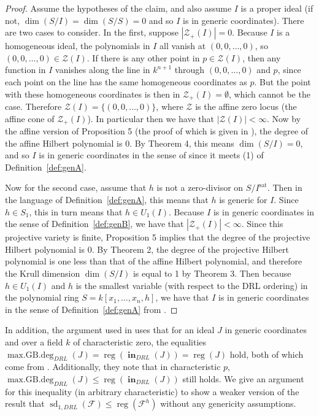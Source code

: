 \documentclass[11pt]{article}
\newcommand{\F}{\mathcal{F}}
\newcommand{\sat}{^{\text{sat}}}
\DeclareMathOperator{\Init}{\mathbf{in}}
\DeclareMathOperator{\sd}{sd}
\DeclareMathOperator{\reg}{reg}
\DeclareMathOperator{\mdeg}{max.GB.deg}
\theoremstyle{definition}
\begin{document}
\begin{proof}
	Assume the hypotheses of the claim, and also assume $I$ is a proper ideal (if not, $\dim(S/I) = \dim(S/S) = 0$ and so $I$ is in generic coordinates). There are two cases to consider. In the first, suppose $|\mathcal{Z}_+(I)| = 0$. Because $I$ is a homogeneous ideal, the polynomials in $I$ all vanish at $(0,0, \dots, 0)$, so $(0,0,\dots,0) \in \mathcal{Z}(I)$. If there is any other point in $p \in \mathcal{Z}(I)$, then any function in $I$ vanishes along the line in $k^{n+1}$ through $(0,0,\dots,0)$ and $p$, since each point on the line has the same homogeneous coordinates as $p$. But the point with these homogeneous coordinates is then in $\mathcal{Z}_+(I) = \emptyset$, which cannot be the case. Therefore $\mathcal{Z}(I) = \{(0,0,\dots,0)\}$, where $\mathcal{Z}$ is the affine zero locus (the affine cone of $\mathcal{Z}_+(I)$). In particular then we have that $|\mathcal{Z}(I)| < \infty$. Now by the affine version of Proposition 5 (the proof of which is given in \cite{cox2013ideals}), the degree of the affine Hilbert polynomial is 0. By Theorem 4, this means $\dim(S/I) = 0$, and so $I$ is in generic coordinates in the sense of \cite{bayer1987criterion} since it meets (1) of Definition~\ref{def:genA}. 

	Now for the second case, assume that $h$ is not a zero-divisor on $S/I\sat$. Then in the language of Definition~\ref{def:genA}, this means that $h$ is generic for $I$. Since $h \in S_1$, this in turn means that $h \in U_1(I)$. Because $I$ is in generic coordinates in the sense of Definition~\ref{def:genB}, we have that $|\mathcal{Z}_+(I)| < \infty$. Since this projective variety is finite, Proposition 5 implies that the degree of the projective Hilbert polynomial is 0. By Theorem 2, the degree of the projective Hilbert polynomial is one less than that of the affine Hilbert polynomial, and therefore the Krull dimension $\dim(S/I)$ is equal to 1 by Theorem 3. Then because $h \in U_1(I)$ and $h$ is the smallest variable (with respect to the DRL ordering) in the polynomial ring $S = k[x_1, \dots, x_n, h]$, we have that $I$ is in generic coordinates in the sense of Definition~\ref{def:genA} from \cite{bayer1987criterion}. 
\end{proof}


In addition, the argument used in \cite{caminata2020solving} uses that for an ideal $J$ in generic coordinates and over a field $k$ of characteristic zero, the equalities $\mdeg_{DRL}(J) = \reg(\Init_{DRL}(J)) = \reg(J)$ hold, both of which come from \cite{bayer1987criterion}. Additionally, they note that in characteristic $p$, $\mdeg_{DRL}(J) \leq \reg(\Init_{DRL}(J))$ still holds. We give an argument for this inequality (in arbitrary characteristic) to show a weaker version of the result that $\sd_{1,DRL}(\F) \leq \reg(\F^h)$ without any genericity assumptions. 
\end{document}
